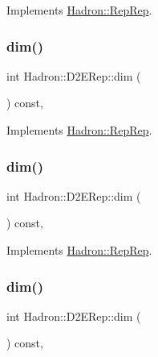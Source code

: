 Implements \mbox{\hyperlink{structHadron_1_1RepRep_a92c8802e5ed7afd7da43ccfd5b7cd92b}{Hadron\+::\+Rep\+Rep}}.

\mbox{\label{structHadron_1_1D2ERep_acf6c72a31e0813079ddaea61133600e4}} 
\subsubsection{\texorpdfstring{dim()}{dim()}\hspace{0.1cm}{\footnotesize\ttfamily [3/5]}}
{\footnotesize\ttfamily int Hadron\+::\+D2\+E\+Rep\+::dim (\begin{DoxyParamCaption}{ }\end{DoxyParamCaption}) const\hspace{0.3cm}{\ttfamily [inline]}, {\ttfamily [virtual]}}



Implements \mbox{\hyperlink{structHadron_1_1RepRep_a92c8802e5ed7afd7da43ccfd5b7cd92b}{Hadron\+::\+Rep\+Rep}}.

\mbox{\label{structHadron_1_1D2ERep_acf6c72a31e0813079ddaea61133600e4}} 
\subsubsection{\texorpdfstring{dim()}{dim()}\hspace{0.1cm}{\footnotesize\ttfamily [4/5]}}
{\footnotesize\ttfamily int Hadron\+::\+D2\+E\+Rep\+::dim (\begin{DoxyParamCaption}{ }\end{DoxyParamCaption}) const\hspace{0.3cm}{\ttfamily [inline]}, {\ttfamily [virtual]}}



Implements \mbox{\hyperlink{structHadron_1_1RepRep_a92c8802e5ed7afd7da43ccfd5b7cd92b}{Hadron\+::\+Rep\+Rep}}.

\mbox{\label{structHadron_1_1D2ERep_acf6c72a31e0813079ddaea61133600e4}} 
\subsubsection{\texorpdfstring{dim()}{dim()}\hspace{0.1cm}{\footnotesize\ttfamily [5/5]}}
{\footnotesize\ttfamily int Hadron\+::\+D2\+E\+Rep\+::dim (\begin{DoxyParamCaption}{ }\end{DoxyParamCaption}) const\hspace{0.3cm}{\ttfamily [inline]}, {\ttfamily [virtual]}}



